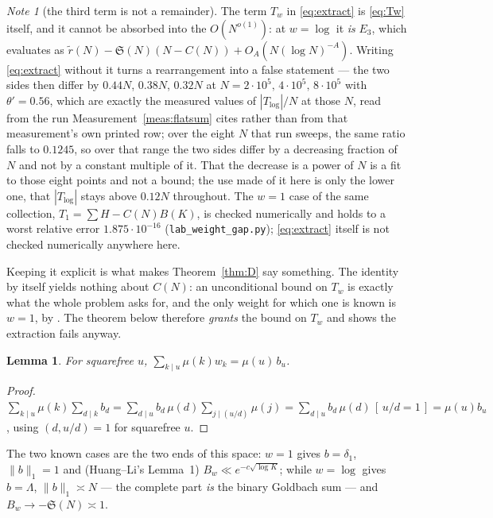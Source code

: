 \documentclass[11pt,a4paper]{article}
\theoremstyle{plain}
\newtheorem{lemma}[theorem]{Lemma}
\theoremstyle{definition}
\theoremstyle{remark}
\newtheorem{note}[theorem]{Note}
\renewcommand{\SS}{\mathfrak{S}}
\begin{document}
\begin{note}[the third term is not a remainder]\label{note:Tw}
The term $T_w$ in \eqref{eq:extract} is \eqref{eq:Tw} itself, and it
cannot be absorbed into the $O(N^{o(1)})$: at $w=\log$ it \emph{is}
$E_3$, which
\cite[Theorem on the identity]{P1} evaluates as
$\tilde r(N)-\SS(N)(N-C(N))+O_A(N(\log N)^{-A})$. Writing
\eqref{eq:extract} without it turns
a rearrangement into a false statement --- the two sides then differ by
$0.44N$, $0.38N$, $0.32N$ at $N=2\cdot10^5,\,4\cdot10^5,\,8\cdot10^5$
with $\theta'=0.56$, which are exactly the measured values of
$|T_{\log}|/N$ at those $N$, read from the run
Measurement~\ref{meas:flatsum} cites rather than from that
measurement's own printed row; over the eight $N$ that run sweeps, the
same ratio falls to $0.1245$, so over that range the two sides differ
by a decreasing fraction of $N$ and not by a constant multiple of it.
That the decrease is a power of $N$ is a fit to those eight points and
not a bound; the use made of it here is only the lower one, that
$|T_{\log}|$ stays above $0.12N$ throughout. The $w=1$ case of the same
collection, $T_1=\sum H-C(N)B(K)$, is checked numerically and holds to
a worst relative error $1.875\cdot10^{-16}$
(\texttt{lab\_weight\_gap.py}); \eqref{eq:extract} itself is not
checked numerically anywhere here.

Keeping it explicit is what makes Theorem~\ref{thm:D} say something.
The identity by itself yields nothing about $C(N)$: an unconditional
bound on $T_w$ is exactly what the whole problem asks for, and the only
weight for which one is known is $w=1$, by \cite[Theorem on the flat branch]{P1}. The
theorem below therefore \emph{grants} the bound on $T_w$ and shows the
extraction fails anyway.
\end{note}

\begin{lemma}\label{lem:Gb}
For squarefree $u$, $\sum_{k\mid u}\mu(k)w_k=\mu(u)\,b_u$.
\end{lemma}

\begin{proof}
$\sum_{k\mid u}\mu(k)\sum_{d\mid k}b_d
 =\sum_{d\mid u}b_d\,\mu(d)\sum_{j\mid(u/d)}\mu(j)
 =\sum_{d\mid u}b_d\,\mu(d)\,[\,u/d=1\,]=\mu(u)b_u$,
using $(d,u/d)=1$ for squarefree $u$.
\end{proof}

The two known cases are the two ends of this space: $w=1$ gives
$b=\delta_1$, $\|b\|_1=1$ and (Huang--Li's Lemma~1)
$B_w\ll e^{-c\sqrt{\log K}}$; while $w=\log$ gives $b=\Lambda$,
$\|b\|_1\asymp N$ --- the complete part \emph{is} the binary Goldbach
sum --- and $B_w\to-\SS(N)\asymp1$.
\end{document}
